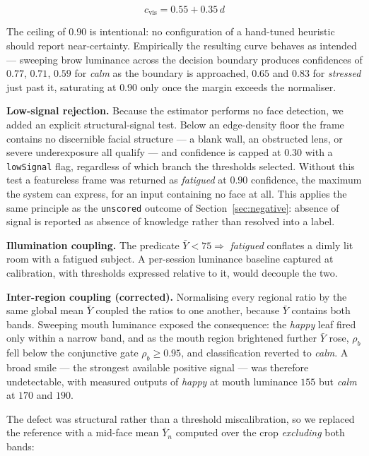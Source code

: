 \documentclass[conference]{IEEEtran}
\begin{document}
\begin{equation}
c_{\text{vis}} = 0.55 + 0.35\,d
\label{eq:visconf}
\end{equation}

The ceiling of $0.90$ is intentional: no configuration of a hand-tuned
heuristic should report near-certainty. Empirically the resulting curve
behaves as intended --- sweeping brow luminance across the decision boundary
produces confidences of $0.77$, $0.71$, $0.59$ for \textit{calm} as the
boundary is approached, $0.65$ and $0.83$ for \textit{stressed} just past it,
saturating at $0.90$ only once the margin exceeds the normaliser.

\textbf{Low-signal rejection.} Because the estimator performs no face
detection, we added an explicit structural-signal test. Below an edge-density
floor the frame contains no discernible facial structure --- a blank wall, an
obstructed lens, or severe underexposure all qualify --- and confidence is
capped at $0.30$ with a \texttt{lowSignal} flag, regardless of which branch
the thresholds selected. Without this test a featureless frame was returned as
\textit{fatigued} at $0.90$ confidence, the maximum the system can express,
for an input containing no face at all. This applies the same principle as the
\texttt{unscored} outcome of Section~\ref{sec:negative}: absence of signal is
reported as absence of knowledge rather than resolved into a label.

\textbf{Illumination coupling.} The predicate $\bar{Y} < 75 \Rightarrow$
\textit{fatigued} conflates a dimly lit room with a fatigued subject. A
per-session luminance baseline captured at calibration, with thresholds
expressed relative to it, would decouple the two.

\textbf{Inter-region coupling (corrected).} Normalising every regional ratio
by the same global mean $\bar{Y}$ coupled the ratios to one another, because
$\bar{Y}$ contains both bands. Sweeping mouth luminance exposed the
consequence: the \textit{happy} leaf fired only within a narrow band, and as
the mouth region brightened further $\bar{Y}$ rose, $\rho_b$ fell below the
conjunctive gate $\rho_b \geq 0.95$, and classification reverted to
\textit{calm}. A broad smile --- the strongest available positive signal ---
was therefore undetectable, with measured outputs of \textit{happy} at mouth
luminance $155$ but \textit{calm} at $170$ and $190$.

The defect was structural rather than a threshold miscalibration, so we
replaced the reference with a mid-face mean $\bar{Y}_n$ computed over the crop
\emph{excluding} both bands:
\end{document}
